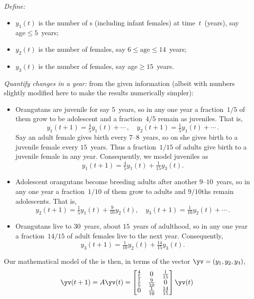 \begin{example}[orangutans]
\begin{solution}
\emph{Define:}
\begin{itemize}
\item \(y_1(t)\) is the number of  s (including infant females) at time~\(t\)~(years), say age\({}\leq5\)~years;
\item \(y_2(t)\) is the number of  females, say \(6\leq\text{age}\leq 14\)~years;
\item \(y_3(t)\) is the number of  females, say age\({}\geq15\)~years.
\end{itemize}
\emph{Quantify changes in a year:} from the given information (albeit with numbers slightly modified here to make the results numerically simpler):
\begin{itemize}
\item Orangutans are juvenile for say \(5\)~years, so in any one year a fraction~\(1/5\) of them grow to be adolescent and a fraction~\(4/5\) remain as juveniles.
That is,
\begin{equation*}
y_1(t+1)=\tfrac45y_1(t)+\cdots\,,\quad y_2(t+1)=\tfrac15y_1(t)+\cdots\,.
\end{equation*}
Say an adult female gives birth every \(7\)--\(8\)~years, so on  she gives birth to a juvenile female every \(15\)~years. 
Thus a fraction~\(1/15\) of adults give birth to a juvenile female in any year.
Consequently, we model juveniles as 
\begin{equation*}
{y_1}(t+1)=\tfrac45y_1(t)+\tfrac1{15}y_3(t).
\end{equation*}
\item Adolescent orangutans become breeding adults after another \(9\)--\(10\)~years, so in any one year a fraction~\(1/10\) of them grow to adults and \(9/10\)ths remain adolescents.
That is, 
\begin{equation*}
{y_2(t+1)}=\tfrac15y_1(t)+\tfrac9{10}y_2(t),\quad
{y_3(t+1)}=\tfrac1{10}y_2(t)+\cdots\,.
\end{equation*}

\item Orangutans live to 30~years, about \(15\)~years of adulthood, so in any one year a fraction~\(14/15\) of adult females live to the next year.  
Consequently, 
\begin{equation*}
{y_3(t+1)}=\tfrac1{10}y_2(t)+\tfrac{14}{15}y_3(t).
\end{equation*}

\end{itemize}

Our mathematical model of the  is then, in terms of the vector \(\yv=(y_1,y_2,y_3)\),  
\begin{equation*}
\yv(t+1)=A\yv(t)
=\begin{bmatrix} \frac45&0&\frac1{15}
\\\frac15&\frac9{10}&0
\\0&\frac1{10}&\frac{14}{15} \end{bmatrix}\yv(t)
\end{equation*}


\end{solution}
\end{example}
